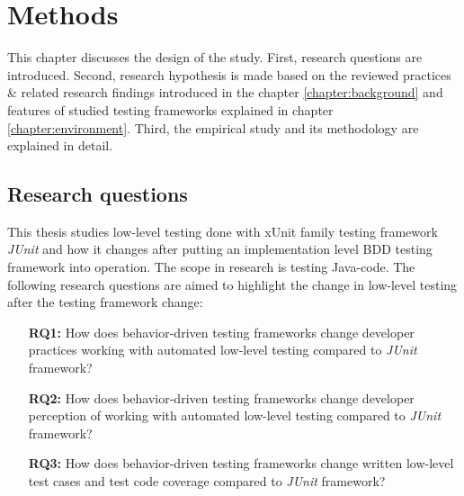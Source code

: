 \chapter{Methods}
\label{chapter:methods}
This chapter discusses the design of the study. First, research questions are introduced.
Second, research hypothesis is made based on the reviewed practices \& related research findings introduced in the chapter \ref{chapter:background}
and features of studied testing frameworks explained in chapter \ref{chapter:environment}.
Third, the empirical study and its methodology are explained in detail.

\section{Research questions}
This thesis studies low-level testing done with xUnit family testing framework	\textit{JUnit}  and how it changes after putting
an implementation level BDD testing framework into operation. The scope in research is testing Java-code. The following
research questions are aimed to highlight the change in low-level testing after the testing framework change:
\begin{addmargin}[2em]{0em}
\vspace{20px}
\begin{itemize}
\item[\textbf{RQ1:}] How does behavior-driven testing frameworks change developer practices working with automated low-level testing compared to	\textit{JUnit}  framework?
\item[\textbf{RQ2:}] How does behavior-driven testing frameworks change developer perception of working with automated low-level testing compared to \textit{JUnit}  framework?
\item[\textbf{RQ3:}] How does behavior-driven testing frameworks change written low-level test cases and test code coverage compared to \textit{JUnit}  framework?
\end{itemize}
\end{addmargin}

